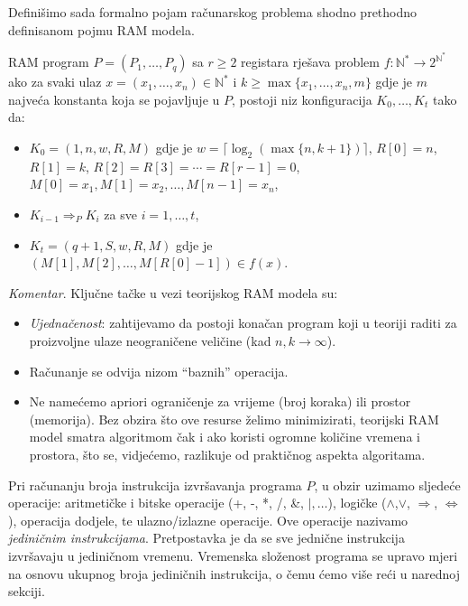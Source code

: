 Definišimo sada formalno pojam računarskog problema shodno prethodno definisanom pojmu RAM modela. 
\begin{definition}
	 RAM program $P = (P_1, \ldots, P_q)$ sa $r \geq 2$ registara rješava problem $f \colon \mathbb{N}^* \rightarrow 2^{\mathbb{N}^* } $
	ako za svaki ulaz $x = (x_1,\ldots, x_n) \in \mathbb{N}^* $ i $k \geq \max\{x_1,\ldots, x_n, m\}$ gdje je $m$ najveća konstanta koja se pojavljuje u $P$, postoji niz konfiguracija $K_0,\ldots,K_t$ tako da:
	\begin{itemize}
		\item $K_0 = (1, n, w, R, M)$ gdje je $w = \lceil \log_2(\max\{n, k +1\})\rceil$, $R[0] = n$, $R[1] = k$, $R[2] = R[3] = \cdots =  R[r-1] = 0$, $M[0] = x_1,
		M[1] = x_2, \ldots , M[n - 1] = x_n$,
		\item $K_{i-1} \Rightarrow_P K_i $ za sve $i = 1, \ldots ,t$,
		\item $K_t = (q+1, S, w, R, M)$ gdje je $(M[1], M[2], \ldots , M[R[0] - 1]) \in  f (x)$. 
	\end{itemize}
\end{definition}

\textit{Komentar}.  Ključne tačke u vezi teorijskog RAM modela su:
\begin{itemize}
	\item  \textit{Ujednačenost}: zahtijevamo da postoji konačan program koji u teoriji raditi za proizvoljne ulaze neograničene veličine
(kad $n, k \rightarrow \infty$).
    \item Računanje se odvija nizom “baznih” operacija.
    \item Ne namećemo apriori ograničenje za vrijeme (broj koraka) ili prostor   (memorija). Bez obzira što ove resurse želimo minimizirati, teorijski RAM model  smatra algoritmom čak i ako koristi ogromne količine vremena i prostora, što se, vidjećemo, razlikuje od praktičnog aspekta algoritama. 
\end{itemize}

Pri računanju broja instrukcija izvršavanja programa $P$, u obzir uzimamo sljedeće operacije: aritmetičke i bitske operacije (+, -, *, /, \&, $\mid,\ldots $), logičke ($\wedge$,$\vee$, $\Rightarrow$, $\Leftrightarrow$), operacija dodjele, te ulazno/izlazne operacije. Ove operacije nazivamo \textit{jediničnim instrukcijama}.  Pretpostavka je da se sve jednične instrukcija izvršavaju u jediničnom vremenu.  Vremenska složenost programa se upravo mjeri na osnovu ukupnog broja jediničnih instrukcija, o čemu ćemo više reći u narednoj sekciji. 

